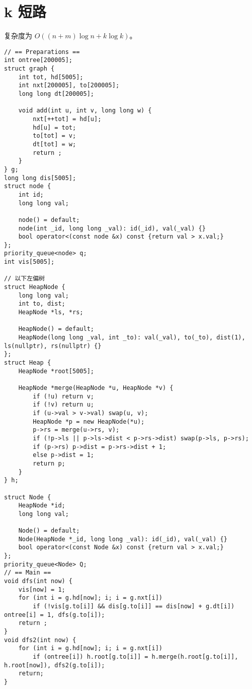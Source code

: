 \section{k 短路}

复杂度为 $O((n + m)\log n + k\log k)$。

\begin{verbatim}
// == Preparations ==
int ontree[200005];
struct graph {
    int tot, hd[5005];
    int nxt[200005], to[200005];
    long long dt[200005];

    void add(int u, int v, long long w) {
        nxt[++tot] = hd[u];
        hd[u] = tot;
        to[tot] = v;
        dt[tot] = w;
        return ;
    }
} g;
long long dis[5005];
struct node {
    int id;
    long long val;

    node() = default;
    node(int _id, long long _val): id(_id), val(_val) {}
    bool operator<(const node &x) const {return val > x.val;}
};
priority_queue<node> q;
int vis[5005];

// 以下左偏树
struct HeapNode {
    long long val;
    int to, dist;
    HeapNode *ls, *rs;

    HeapNode() = default;
    HeapNode(long long _val, int _to): val(_val), to(_to), dist(1), ls(nullptr), rs(nullptr) {}
};
struct Heap {
    HeapNode *root[5005];

    HeapNode *merge(HeapNode *u, HeapNode *v) {
        if (!u) return v;
        if (!v) return u;
        if (u->val > v->val) swap(u, v);
        HeapNode *p = new HeapNode(*u);
        p->rs = merge(u->rs, v);
        if (!p->ls || p->ls->dist < p->rs->dist) swap(p->ls, p->rs);
        if (p->rs) p->dist = p->rs->dist + 1;
        else p->dist = 1;
        return p;
    }
} h;

struct Node {
    HeapNode *id;
    long long val;

    Node() = default;
    Node(HeapNode *_id, long long _val): id(_id), val(_val) {}
    bool operator<(const Node &x) const {return val > x.val;}
};
priority_queue<Node> Q;
// == Main ==
void dfs(int now) {
    vis[now] = 1;
    for (int i = g.hd[now]; i; i = g.nxt[i])
        if (!vis[g.to[i]] && dis[g.to[i]] == dis[now] + g.dt[i]) ontree[i] = 1, dfs(g.to[i]);
    return ;
}
void dfs2(int now) {
    for (int i = g.hd[now]; i; i = g.nxt[i])
        if (ontree[i]) h.root[g.to[i]] = h.merge(h.root[g.to[i]], h.root[now]), dfs2(g.to[i]);
    return;
}


\end{verbatim}
